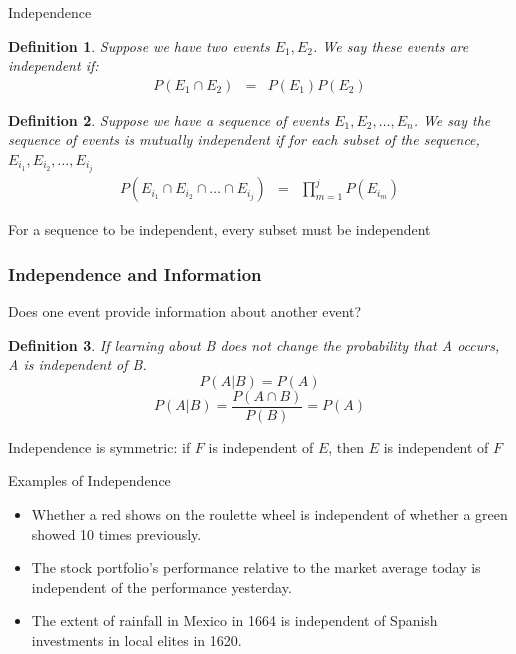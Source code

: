 \documentclass[aspectratio=169]{beamer}
\newtheorem{defn}{Definition}
\numberwithin{equation}{section}
\begin{document}
\begin{frame}{Independence}

\begin{defn}
Suppose we have two events $E_{1}, E_{2}$.  We say these events are \alert{independent} if:
\begin{eqnarray}
P(E_{1}\cap E_{2}) & = & P(E_{1}) P( E_{2}) \nonumber 
\end{eqnarray}
\end{defn}

\end{frame}



\begin{frame}

\begin{defn}
Suppose we have a sequence of events $E_{1}, E_{2}, \hdots, E_{n}$.  We say the sequence of events is \alert{mutually independent} if for each subset of the sequence,  $E_{i_{1}}, E_{i_{2}}, \hdots, E_{i_{j}}$ 
\begin{eqnarray}
P(E_{i_{1}}\cap E_{i_{2}}\cap \hdots \cap E_{i_{j}}) & = & \prod_{m = 1}^{j} P(E_{i_{m}}) \nonumber 
\end{eqnarray}
\end{defn}

\alert{For a sequence to be independent, every subset must be independent }


\end{frame}


\begin{frame}
\frametitle{Independence and Information} 

Does one event provide \alert{information} about another event? \pause 

\begin{defn} 
If learning about B does not change the probability that A occurs, A is independent of B.
 $$P(A|B)=P(A)$$\pause
 $$P(A|B)=\frac{P(A\cap B)}{P(B)}=P(A)$$
\end{defn}
\pause

Independence is symmetric: if $F$ is independent of $E$, then
  $E$ is independent of $F$

\end{frame}


\begin{frame}{Examples of Independence}

\begin{itemize}
\item Whether a red shows on the roulette wheel is independent of whether a green showed 10 times previously.\pause
\item The stock portfolio's performance relative to the market average today is independent of the performance yesterday.\pause
\item The extent of rainfall in Mexico in 1664 is independent of Spanish investments in local elites in 1620. 
\end{itemize}
\end{frame}
\end{document}
